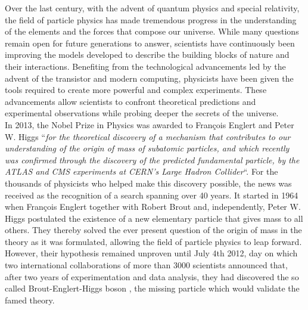 Over the last century, with the advent of quantum physics and special relativity, the field of particle physics has made tremendous progress in the understanding of the elements and the forces that compose our universe. While many questions remain open for future generations to answer, scientists have continuously been improving the models developed to describe the building blocks of nature and their interactions. Benefiting from the technological advancements led by the advent of the transistor and modern computing, physicists have been given the tools required to create more powerful and complex experiments. These advancements allow scientists to confront theoretical predictions and experimental observations while probing deeper the secrets of the universe. \\

In 2013, the Nobel Prize in Physics was awarded to Fran\c{c}ois Englert and Peter W. Higgs ``\textit{for the theoretical discovery of a mechanism that contributes to our understanding of the origin of mass of subatomic particles, and which recently was confirmed through the discovery of the predicted fundamental particle, by the ATLAS and CMS experiments at CERN's Large Hadron Collider}``. For the thousands of physicists who helped make this discovery possible, the news was received as the recognition of a search spanning over 40 years. It started in 1964 when Fran\c{c}ois Englert together with Robert Brout \cite{PhysRevLett.13.321} and, independently, Peter W. Higgs \cite{PhysRevLett.13.508} postulated the existence of a new elementary particle that gives mass to all others. They thereby solved the ever present question of the origin of mass in the theory as it was formulated, allowing the field of particle physics to leap forward. However, their hypothesis remained unproven until July 4th 2012, day on which two international collaborations of more than 3000 scientists announced that, after two years of experimentation and data analysis, they had discovered the so called Brout-Englert-Higgs boson \cite{PhysRevLett.114.191803}, the missing particle which would validate the famed theory. \\

